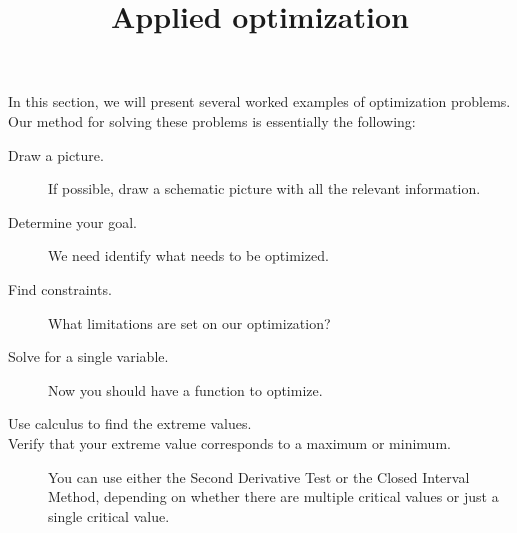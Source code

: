 \documentclass{ximera}
\title{Applied optimization}
\begin{document}
\begin{abstract}
\end{abstract}
\maketitle


In this section, we will present several worked examples of
optimization problems. Our method for solving these problems is
essentially the following:
\begin{description}
\item[Draw a picture.] If possible, draw a schematic picture with all the relevant information. 
\item[Determine your goal.] We need identify what needs to be
  optimized.
\item[Find constraints.] What limitations are set on our
  optimization?
\item[Solve for a single variable.] Now you should have a function to optimize.
\item[Use calculus to find the extreme values.] 
\item[Verify that your extreme value corresponds to a maximum or minimum.] You can use either the Second Derivative Test or the Closed Interval Method, depending on whether there are multiple critical values or just a single critical value.
\end{description}
\end{document}
